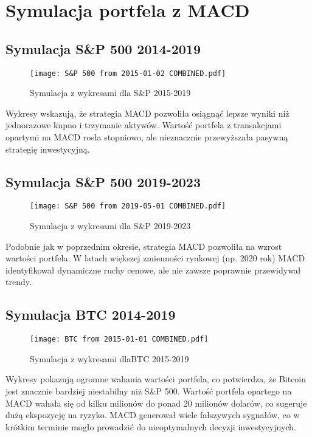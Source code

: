 \documentclass[12pt, letterpaper]{article}
\begin{document}
\vspace{10cm} 
\section{Symulacja portfela z MACD}

\subsection{Symulacja S\&P 500 2014-2019}
\begin{figure}[h!]
    \centering

    \texttt{[image: S\&P 500 from 2015-01-02 COMBINED.pdf]}
    \caption{Symulacja z wykresami dla S\&P 2015-2019}
    \label{fig:BTC_2014_2017}
\end{figure}
Wykresy wskazują, że strategia MACD pozwoliła osiągnąć lepsze wyniki niż jednorazowe kupno i trzymanie aktywów.
Wartość portfela z transakcjami opartymi na MACD rosła stopniowo, ale nieznacznie przewyższała pasywną strategię inwestycyjną.

\vspace{10cm} 
\subsection{Symulacja S\&P 500 2019-2023}
\begin{figure}[h!]
    \centering
    \texttt{[image: S\&P 500 from 2019-05-01 COMBINED.pdf]}
    \caption{Symulacja z wykresami dla S\&P 2019-2023}
    \label{fig:BTC_2014_2017}
\end{figure}

Podobnie jak w poprzednim okresie, strategia MACD pozwoliła na wzrost wartości portfela.
W latach większej zmienności rynkowej (np. 2020 rok) MACD identyfikował dynamiczne ruchy cenowe, ale nie zawsze poprawnie przewidywał trendy.

\vspace{10cm} 
\subsection{Symulacja BTC 2014-2019}
\begin{figure}[h!]
    \centering
    \texttt{[image: BTC from 2015-01-01 COMBINED.pdf]}
    \caption{Symulacja z wykresami dlaBTC 2015-2019}
    \label{fig:BTC_2014_2017}
\end{figure}
Wykresy pokazują ogromne wahania wartości portfela, co potwierdza, że Bitcoin jest znacznie bardziej niestabilny niż S\&P 500.
Wartość portfela opartego na MACD wahała się od kilku milionów do ponad 20 milionów dolarów, co sugeruje dużą ekspozycję na ryzyko.
MACD generował wiele fałszywych sygnałów, co w krótkim terminie mogło prowadzić do nieoptymalnych decyzji inwestycyjnych.
\end{document}
